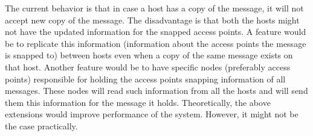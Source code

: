 The current behavior is that in case a host has a copy of the message, it will not accept new copy of the message. The disadvantage is that both the hosts might not have the updated information for the snapped access points. A feature would be to replicate this information (information about the access points the message is snapped to) between hosts even when a copy of the same message exists on that host.\newline
Another feature would be to have specific nodes (preferably access points) responsible for holding the access points snapping information of all messages. These nodes will read such information from all the hosts and will send them this information for the message it holds.\newline
Theoretically, the above extensions would improve performance of the system. However, it might not be the case practically.
